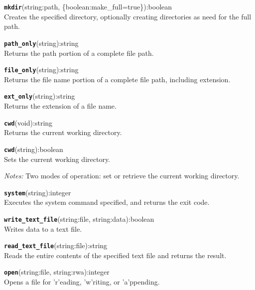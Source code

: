 \hrulefill

\texttt{{\large\textbf{mkdir}}}\textsf{(string:path, \{boolean:make\_full=true\}):boolean}\\
 Creates the specified directory, optionally creating directories as need for the full path.

\hrulefill

\texttt{{\large\textbf{path\_only}}}\textsf{(string):string}\\
 Returns the path portion of a complete file path.

\hrulefill

\texttt{{\large\textbf{file\_only}}}\textsf{(string):string}\\
 Returns the file name portion of a complete file path, including extension.

\hrulefill

\texttt{{\large\textbf{ext\_only}}}\textsf{(string):string}\\
 Returns the extension of a file name.

\hrulefill

\texttt{{\large\textbf{cwd}}}\textsf{(void):string}\\
 Returns the current working directory.

\texttt{{\large\textbf{cwd}}}\textsf{(string):boolean}\\
 Sets the current working directory.

\emph{Notes:} Two modes of operation: set or retrieve the current working directory.

\hrulefill

\texttt{{\large\textbf{system}}}\textsf{(string):integer}\\
 Executes the system command specified, and returns the exit code.

\hrulefill

\texttt{{\large\textbf{write\_text\_file}}}\textsf{(string:file, string:data):boolean}\\
 Writes data to a text file.

\hrulefill

\texttt{{\large\textbf{read\_text\_file}}}\textsf{(string:file):string}\\
 Reads the entire contents of the specified text file and returns the result.

\hrulefill

\texttt{{\large\textbf{open}}}\textsf{(string:file, string:rwa):integer}\\
 Opens a file for 'r'eading, 'w'riting, or 'a'ppending.

